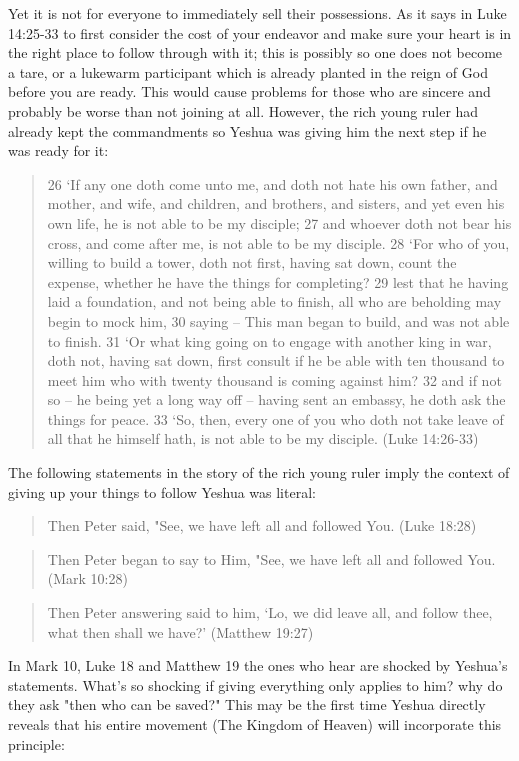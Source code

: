 \documentclass[11pt]{article}
\begin{document}
Yet it is not for everyone to immediately sell their possessions. As it says in Luke 14:25-33 to first consider the cost of your endeavor and make sure your heart is in the right place to follow through with it; this is possibly so one does not become a tare, or a lukewarm participant which is already planted in the reign of God before you are ready. This would cause problems for those who are sincere and probably be worse than not joining at all. However, the rich young ruler had already kept the commandments so Yeshua was giving him the next step if he was ready for it:
\begin{quote}
26 `If any one doth come unto me, and doth not hate his own father, and mother, and wife, and children, and brothers, and sisters, and yet even his own life, he is not able to be my disciple;
27 and whoever doth not bear his cross, and come after me, is not able to be my disciple.
28 `For who of you, willing to build a tower, doth not first, having sat down, count the expense, whether he have the things for completing?
29 lest that he having laid a foundation, and not being able to finish, all who are beholding may begin to mock him,
30 saying -- This man began to build, and was not able to finish.
31 `Or what king going on to engage with another king in war, doth not, having sat down, first consult if he be able with ten thousand to meet him who with twenty thousand is coming against him?
32 and if not so -- he being yet a long way off -- having sent an embassy, he doth ask the things for peace.
33 `So, then, every one of you who doth not take leave of all that he himself hath, is not able to be my disciple. (Luke 14:26-33)
\end{quote}
The following statements in the story of the rich young ruler imply the context of giving up your things to follow Yeshua was literal:
\begin{quote}
Then Peter said, "See, we have left all and followed You. (Luke 18:28)
\end{quote}
\begin{quote}
Then Peter began to say to Him, "See, we have left all and followed You. (Mark 10:28)
\end{quote}
\begin{quote}
Then Peter answering said to him, `Lo, we did leave all, and follow thee, what then shall we have?' (Matthew 19:27)
\end{quote}
In Mark 10, Luke 18 and Matthew 19 the ones who hear are shocked by Yeshua's statements. What's so shocking if giving everything only applies to him? why do they ask "then who can be saved?" This may be the first time Yeshua directly reveals that his entire movement (The Kingdom of Heaven) will incorporate this principle:
\end{document}
